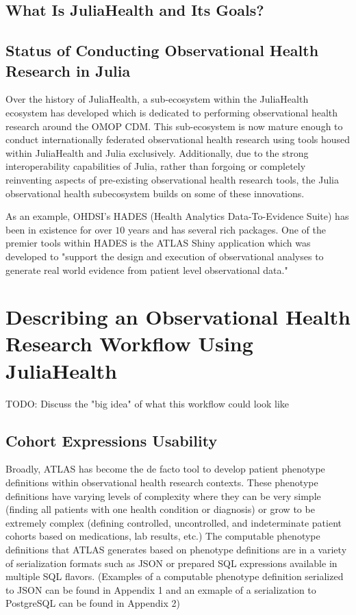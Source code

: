 \documentclass{juliacon}
\begin{document}
\subsection{What Is JuliaHealth and Its Goals?}

\subsection{Status of Conducting Observational Health Research in Julia}

Over the history of JuliaHealth, a sub-ecosystem within the JuliaHealth ecosystem has developed which is dedicated to performing observational health research around the OMOP CDM.
This sub-ecosystem is now mature enough to conduct internationally federated observational health research using tools housed within JuliaHealth and Julia exclusively.
Additionally, due to the strong interoperability capabilities of Julia, rather than forgoing or completely reinventing aspects of pre-existing observational health research tools, the Julia observational health subecosystem builds on some of these innovations.

As an example, OHDSI's HADES (Health Analytics Data-To-Evidence Suite) has been in existence for over $10$ years and has several rich packages.
One of the premier tools within HADES is the ATLAS Shiny application which was developed to "support the design and execution of observational analyses to generate real world evidence from patient level observational data."

\section{Describing an Observational Health Research Workflow Using JuliaHealth}

TODO: Discuss the "big idea" of what this workflow could look like

\subsection{Cohort Expressions Usability}

Broadly, ATLAS has become the de facto tool to develop patient phenotype definitions within observational health research contexts.
These phenotype definitions have varying levels of complexity where they can be very simple (finding all patients with one health condition or diagnosis) or grow to be extremely complex (defining controlled, uncontrolled, and indeterminate patient cohorts based on medications, lab results, etc.)
The computable phenotype definitions that ATLAS generates based on phenotype definitions are in a variety of serialization formats such as JSON or prepared SQL expressions available in multiple SQL flavors.
(Examples of a computable phenotype definition serialized to JSON can be found in Appendix 1 and an exmaple of a serialization to PostgreSQL can be found in Appendix 2)
\end{document}
